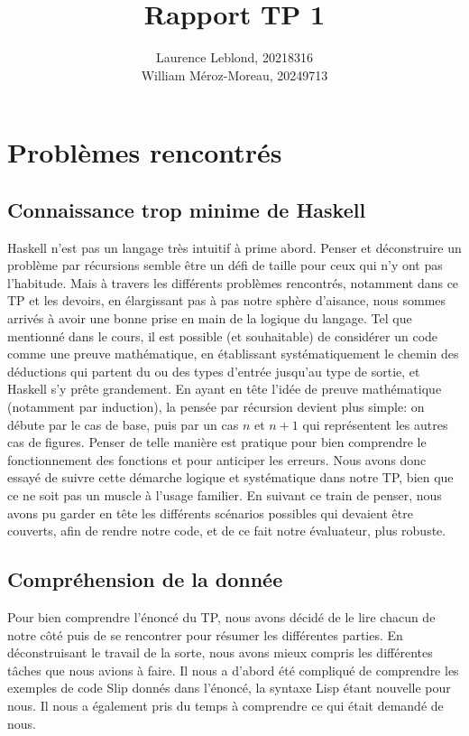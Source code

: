 \documentclass{article}
\title{Rapport TP 1}
\author{Laurence Leblond, 20218316 \\ William Méroz-Moreau, 20249713}
\begin{document}
	\maketitle

	\section{Problèmes rencontrés}

	\subsection{Connaissance trop minime de Haskell}

	Haskell n'est pas un langage très intuitif à prime abord. Penser et déconstruire
	un problème par récursions semble être un défi de taille pour ceux qui n'y ont
	pas l'habitude. Mais à travers les différents problèmes rencontrés, notamment dans
	ce TP et les devoirs, en élargissant pas à pas notre sphère d'aisance, nous sommes
	arrivés à avoir une bonne prise en main de la logique du langage. Tel que
	mentionné dans le cours, il est possible (et souhaitable) de considérer un code
	comme une preuve mathématique, en établissant systématiquement le chemin des
	déductions qui partent du ou des types d'entrée jusqu'au type de sortie, et Haskell
	s'y prête grandement. En ayant en tête l'idée de preuve mathématique (notamment
	par induction), la pensée par récursion devient plus simple: on débute par le
	cas de base, puis par un cas $n$ et $n+1$ qui représentent les autres cas de figures.
	Penser de telle manière est pratique pour bien comprendre le fonctionnement
	des fonctions et pour anticiper les erreurs. Nous avons donc essayé de suivre cette
	démarche logique et systématique dans notre TP, bien que ce ne soit pas un
	muscle à l'usage familier. En suivant ce train de penser, nous avons pu garder
	en tête les différents scénarios possibles qui devaient être couverts, afin de rendre
	notre code, et de ce fait notre évaluateur, plus robuste.

	\subsection{Compréhension de la donnée}

	Pour bien comprendre l'énoncé du TP, nous avons décidé de le lire chacun de notre
	côté puis de se rencontrer pour résumer les différentes parties. En
	déconstruisant le travail de la sorte, nous avons mieux compris les différentes
	tâches que nous avions à faire. Il nous a d'abord été compliqué de comprendre
	les exemples de code Slip donnés dans l'énoncé, la syntaxe Lisp étant nouvelle
	pour nous. Il nous a également pris du temps à comprendre ce qui était demandé
	de nous.
\end{document}
